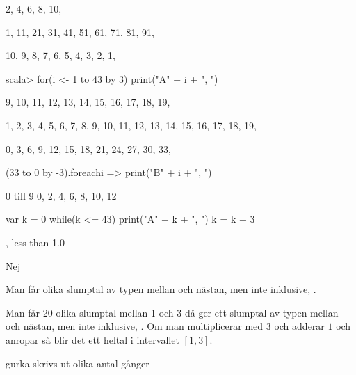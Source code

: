 {{2, 4, 6, 8, 10,

1, 11, 21, 31, 41, 51, 61, 71, 81, 91,

10, 9, 8, 7, 6, 5, 4, 3, 2, 1,

\Subtask 

\begin{REPLnonum}
scala> for(i <- 1 to 43 by 3) print("A" + i + ", ")
\end{REPLnonum}

\Task %

\Subtask 

9, 10, 11, 12, 13, 14, 15, 16, 17, 18, 19,

1, 2, 3, 4, 5, 6, 7, 8, 9, 10, 11, 12, 13, 14, 15, 16, 17, 18, 19,

0, 3, 6, 9, 12, 15, 18, 21, 24, 27, 30, 33,

\Subtask 

(33 to 0 by -3).foreach{i => print("B" + i + ", ")}

\Task %

\Subtask 

0 till 9
0, 2, 4, 6, 8, 10, 12

\Subtask 

\begin{REPLnonum}
var k = 0
while(k <= 43)
{
print("A" + k + ", ")
k = k + 3
}
\end{REPLnonum}

\Subtask {}

\Task %

\Subtask  {}

, less than 1.0

\Subtask  Nej

\Subtask Man får olika slumptal av typen  mellan  och nästan, men inte inklusive, .

\Subtask Man får 20 olika slumptal mellan 1 och 3 då  ger ett slumptal av typen  mellan  och nästan, men inte inklusive, . Om man multiplicerar med $3$ och adderar $1$ och anropar  så blir det ett heltal i intervallet $[1, 3]$.    

\Subtask {}

\Subtask {}

\Subtask  gurka skrivs ut olika antal gånger

\Subtask {}

}}
